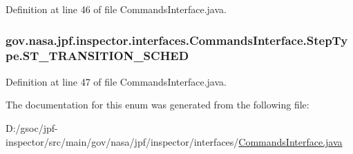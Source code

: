 Definition at line 46 of file Commands\+Interface.\+java.

\subsubsection[{\texorpdfstring{S\+T\+\_\+\+T\+R\+A\+N\+S\+I\+T\+I\+O\+N\+\_\+\+S\+C\+H\+ED}{ST_TRANSITION_SCHED}}]{\setlength{\rightskip}{0pt plus 5cm}gov.\+nasa.\+jpf.\+inspector.\+interfaces.\+Commands\+Interface.\+Step\+Type.\+S\+T\+\_\+\+T\+R\+A\+N\+S\+I\+T\+I\+O\+N\+\_\+\+S\+C\+H\+ED}\hypertarget{enumgov_1_1nasa_1_1jpf_1_1inspector_1_1interfaces_1_1_commands_interface_1_1_step_type_a170e079b171c6f563ab22145123d4e95}{}\label{enumgov_1_1nasa_1_1jpf_1_1inspector_1_1interfaces_1_1_commands_interface_1_1_step_type_a170e079b171c6f563ab22145123d4e95}


Definition at line 47 of file Commands\+Interface.\+java.



The documentation for this enum was generated from the following file\+:\begin{DoxyCompactItemize}
\item 
D\+:/gsoc/jpf-\/inspector/src/main/gov/nasa/jpf/inspector/interfaces/\hyperlink{_commands_interface_8java}{Commands\+Interface.\+java}\end{DoxyCompactItemize}

